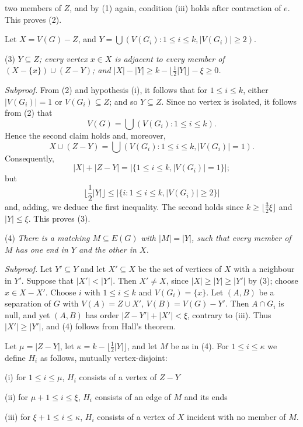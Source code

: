 \noindent two members of $Z$, and by (1) again, condition (iii) holds after contraction of $e$. This proves (2).

Let $X = V(G) - Z$, and $Y = \bigcup(V(G_i) : 1 \le i \le k, |V(G_i)| \ge 2)$.

\hspace*{12pt}(3) \textit{$Y \subseteq Z$; every vertex $x \in X$ is adjacent to every member of $(X - \{x\}) \cup (Z - Y)$; and $|X| - |Y| \ge k - \lfloor \frac{1}{2}|Y| \rfloor - \xi \ge 0$.}

\textit{Subproof.} From (2) and hypothesis (i), it follows that for $1 \le i \le k$, either $|V(G_i)| = 1$ or $V(G_i) \subseteq Z$; and so $Y \subseteq Z$. Since no vertex is isolated, it follows from (2) that
\begin{equation*}
V(G) = \bigcup(V(G_i) : 1 \le i \le k).
\end{equation*}
Hence the second claim holds and, moreover,
\begin{equation*}
X \cup (Z - Y) = \bigcup(V(G_i) : 1 \le i \le k, |V(G_i)| = 1).
\end{equation*}
Consequently,
\begin{equation*}
|X| + |Z - Y| = |\{1 \le i \le k, |V(G_i)| = 1\}|;
\end{equation*}
but
\begin{equation*}
\lfloor \frac{1}{2}|Y| \rfloor \le |\{i : 1 \le i \le k, |V(G_i)| \ge 2\}|
\end{equation*}
and, adding, we deduce the first inequality. The second holds since $k \ge \lfloor \frac{3}{2}\xi \rfloor$ and $|Y| \le \xi$. This proves (3).

\hspace*{12pt}(4) \textit{There is a matching $M \subseteq E(G)$ with $|M| = |Y|$, such that every member of $M$ has one end in $Y$ and the other in $X$.}

\textit{Subproof.} Let $Y' \subseteq Y$ and let $X' \subseteq X$ be the set of vertices of $X$ with a neighbour in $Y'$. Suppose that $|X'| < |Y'|$. Then $X' \ne X$, since $|X| \ge |Y| \ge |Y'|$ by (3); choose $x \in X - X'$. Choose $i$ with $1 \le i \le k$ and $V(G_i) = \{x\}$. Let $(A, B)$ be a separation of $G$ with $V(A) = Z \cup X'$, $V(B) = V(G) - Y'$. Then $A \cap G_i$ is null, and yet $(A, B)$ has order $|Z - Y'| + |X'| < \xi$, contrary to (iii). Thus $|X'| \ge |Y'|$, and (4) follows from Hall's theorem.

Let $\mu = |Z - Y|$, let $\kappa = k - \lfloor \frac{1}{2}|Y| \rfloor$, and let $M$ be as in (4). For $1 \le i \le \kappa$ we define $H_i$ as follows, mutually vertex-disjoint:

\hspace*{12pt}(i) for $1 \le i \le \mu$, $H_i$ consists of a vertex of $Z - Y$

\hspace*{12pt}(ii) for $\mu + 1 \le i \le \xi$, $H_i$ consists of an edge of $M$ and its ends

\hspace*{12pt}(iii) for $\xi + 1 \le i \le \kappa$, $H_i$ consists of a vertex of $X$ incident with no member of $M$.
